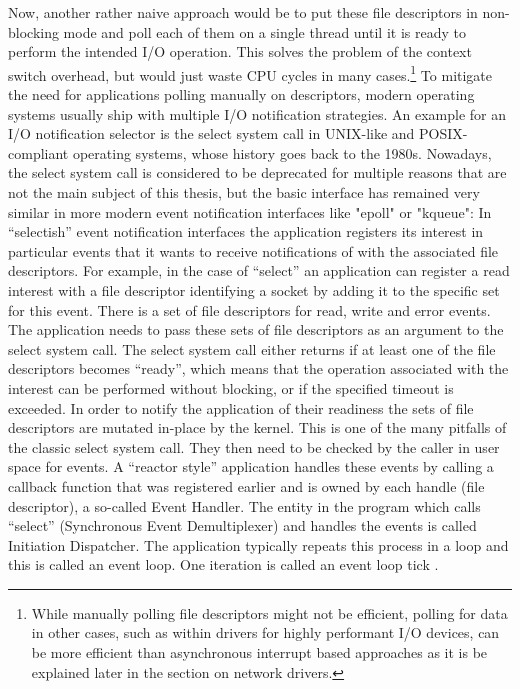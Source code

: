 Now, another rather naive approach would be to put these file descriptors in non-blocking mode and poll each of them on a single thread until it is ready to perform the intended I/O operation. This solves the problem of the context switch overhead, but would just waste CPU cycles in many cases.\footnote{While manually polling file descriptors might not be efficient, polling for data in other cases, such as within drivers for highly performant I/O devices, can be more efficient than asynchronous interrupt based approaches as it is be explained later in the section on network drivers.} \newline
To mitigate the need for applications polling manually on descriptors, modern operating systems usually ship with multiple I/O notification strategies. An example for an I/O notification selector is the select system call in UNIX-like and POSIX-compliant operating systems, whose history goes back to the 1980s. Nowadays, the select system call is considered to be deprecated for multiple reasons that are not the main subject of this thesis, but the basic interface has remained very similar in more modern event notification interfaces like "epoll" or "kqueue":\newline
In “selectish” event notification interfaces the application registers its interest in particular events that it wants to receive notifications of with the associated file descriptors. For example, in the case of “select” an application can register a read interest with a file descriptor identifying a socket by adding it to the specific set for this event. There is a set of file descriptors for read, write and error events. The application needs to pass these sets of file descriptors as an argument to the select system call. The select system call either returns if at least one of the file descriptors becomes “ready”, which means that the operation associated with the interest can be performed without blocking, or if the specified timeout is exceeded. In order to notify the application of their readiness the sets of file descriptors are mutated in-place by the kernel. This is one of the many pitfalls of the classic select system call. They then need to be checked by the caller in user space for events.
A “reactor style” application handles these events by calling a callback function that was registered earlier and is owned by each handle (file descriptor), a so-called Event Handler. The entity in the program which calls “select” (Synchronous Event Demultiplexer) and handles the events is called Initiation Dispatcher. The application typically repeats this process in a loop and this is called an event loop. One iteration is called an event loop tick \cite{schmidt:reactor}. \newline
